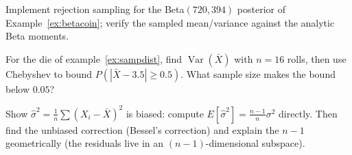 \begin{exercise}[hard]
Implement rejection sampling for the Beta$(720,394)$ posterior of
Example~\ref{ex:betacoin}; verify the sampled mean/variance against the
analytic Beta moments.
\end{exercise}
\begin{exercise}[medium]
For the die of example~\ref{ex:sampdist}, find
$\operatorname{Var}(\bar X)$ with $n=16$ rolls, then use Chebyshev to
bound $P(|\bar X-3.5|\geq0.5)$. What sample size makes the bound
below $0.05$?
\end{exercise}
\begin{exercise}[hard]
Show $\hat\sigma^{2}=\frac1n\sum(X_i-\bar X)^{2}$ is biased: compute
$E[\hat\sigma^{2}]=\frac{n-1}{n}\sigma^{2}$ directly. Then find the
unbiased correction (Bessel's correction) and explain the $n-1$
geometrically (the residuals live in an $(n-1)$-dimensional subspace).
\end{exercise}

